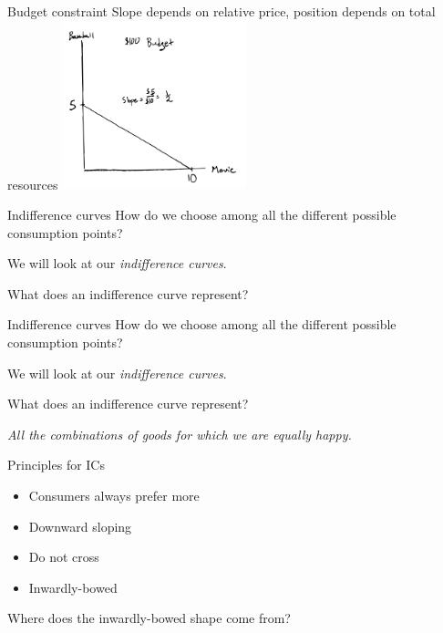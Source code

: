 \documentclass[aspectratio=169]{beamer}
\begin{document}
\begin{frame}{Budget constraint}
    Slope depends on relative price, position depends on total resources
    \centering
        \includegraphics[width = 0.4\textwidth,keepaspectratio]{../figs/BC2.png}
\end{frame}

\begin{frame}{Indifference curves}
    How do we choose among all the different possible consumption points?

    \vspace{2mm}

    We will look at our \textit{indifference curves}.

    \vspace{2mm}

    What does an indifference curve represent?
\end{frame}

\begin{frame}{Indifference curves}
    How do we choose among all the different possible consumption points?

    \vspace{2mm}

    We will look at our \textit{indifference curves}.

    \vspace{2mm}

    What does an indifference curve represent?

    \vspace{2mm}
    \begin{center}
        \textit{All the combinations of goods for which we are equally happy.}
    \end{center}
\end{frame}

\begin{frame}{Principles for ICs}
    \begin{itemize}
        \item Consumers always prefer more
        \item Downward sloping
        \item Do not cross
        \item Inwardly-bowed
    \end{itemize}

    Where does the inwardly-bowed shape come from?
\end{frame}
\end{document}
